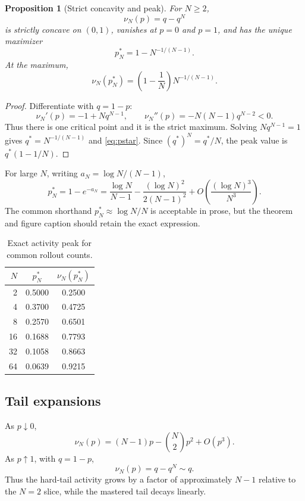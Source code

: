 \documentclass[11pt]{article}
\newtheorem{proposition}[theorem]{Proposition}
\theoremstyle{definition}
\theoremstyle{remark}
\begin{document}
\begin{proposition}[Strict concavity and peak]
For $N\ge2$,
\[
\nu_N(p)=q-q^N
\]
is strictly concave on $(0,1)$, vanishes at $p=0$ and $p=1$, and has the unique maximizer
\begin{equation}
 p_N^*=1-N^{-1/(N-1)}.
\label{eq:pstar}
\end{equation}
At the maximum,
\begin{equation}
 \nu_N(p_N^*)=\left(1-\frac1N\right)N^{-1/(N-1)}.
\label{eq:numax}
\end{equation}
\end{proposition}

\begin{proof}
Differentiate with $q=1-p$:
\[
\nu_N'(p)=-1+Nq^{N-1},
\qquad
\nu_N''(p)=-N(N-1)q^{N-2}<0.
\]
Thus there is one critical point and it is the strict maximum. Solving $Nq^{N-1}=1$ gives $q^*=N^{-1/(N-1)}$ and \cref{eq:pstar}. Since $(q^*)^{N}=q^*/N$, the peak value is $q^*(1-1/N)$.
\end{proof}

For large $N$, writing $a_N=\log N/(N-1)$,
\begin{equation}
 p_N^*=1-e^{-a_N}
 =\frac{\log N}{N-1}
 -\frac{(\log N)^2}{2(N-1)^2}
 +O\!\left(\frac{(\log N)^3}{N^3}\right).
\end{equation}
The common shorthand $p_N^*\approx \log N/N$ is acceptable in prose, but the theorem and figure caption should retain the exact expression.

\begin{table}[H]
\centering
\caption{Exact activity peak for common rollout counts.}
\begin{tabular}{@{}rcc@{}}
\toprule
$N$ & $p_N^*$ & $\nu_N(p_N^*)$\\
\midrule
2 & 0.5000 & 0.2500\\
4 & 0.3700 & 0.4725\\
8 & 0.2570 & 0.6501\\
16 & 0.1688 & 0.7793\\
32 & 0.1058 & 0.8663\\
64 & 0.0639 & 0.9215\\
\bottomrule
\end{tabular}
\end{table}

\subsection{Tail expansions}

As $p\downarrow0$,
\begin{equation}
\nu_N(p)=(N-1)p-\binom{N}{2}p^2+O(p^3).
\label{eq:hardtail}
\end{equation}
As $p\uparrow1$, with $q=1-p$,
\begin{equation}
\nu_N(p)=q-q^N\sim q.
\label{eq:easytail}
\end{equation}
Thus the hard-tail activity grows by a factor of approximately $N-1$ relative to the $N=2$ slice, while the mastered tail decays linearly.
\end{document}
